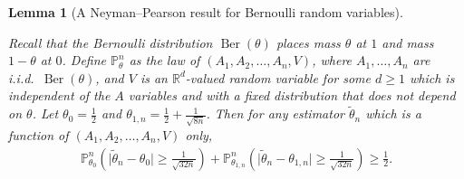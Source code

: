 \documentclass[11pt,lof]{puthesis}
\renewcommand{\P}{\ensuremath{\mathbb{P}}}
\newcommand{\R}{\ensuremath{\mathbb{R}}}
\DeclareMathOperator{\Ber}{Ber}
\theoremstyle{break}
\newtheorem{lemma}{Lemma}[section]
\theoremstyle{proof}
\begin{document}
\begin{lemma}[A Neyman--Pearson result for Bernoulli random variables]
  \label{lem:kernel_app_neyman_pearson_bernoulli}

  Recall that the Bernoulli distribution
  $\Ber(\theta)$
  places mass $\theta$ at $1$ and mass
  $1-\theta$ at $0$.
  Define $\P_\theta^n$ as the law of
  $(A_1, A_2, \ldots, A_n, V)$,
  where $A_1, \ldots, A_n$
  are i.i.d.\ $\Ber(\theta)$,
  and $V$ is an $\R^d$-valued random variable
  for some $d \geq 1$
  which is independent of the $A$ variables
  and with a fixed distribution that does not depend on $\theta$.
  Let $\theta_0 = \frac{1}{2}$
  and $\theta_{1,n} = \frac{1}{2} + \frac{1}{\sqrt{8n}}$.
  Then for any estimator $\tilde \theta_n$
  which is a function of
  $(A_1, A_2, \ldots, A_n, V)$ only,
  \begin{align*}
    \P_{\theta_0}^n \left(
      \big| \tilde \theta_n - \theta_0 \big|
      \geq \frac{1}{\sqrt{32n}}
    \right)
    + \P_{\theta_{1,n}}^n \left(
      \big| \tilde \theta_n - \theta_{1,n} \big|
      \geq \frac{1}{\sqrt{32n}}
    \right)
    \geq \frac{1}{2}.
  \end{align*}

\end{lemma}
\end{document}
